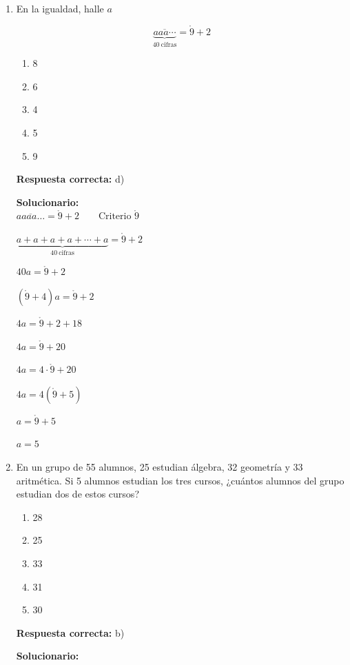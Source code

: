 \begin{enumerate}
	$x=40$
	
	\vspace{6mm}
	
	\item En la igualdad, halle $a$
	
	$$\overline{\underbrace{aaa\cdots}_{40\ \text{cifras}}}=\mathring{9}
	+2$$
	
	\begin{enumerate}[label=\alph*)]
		\item 8
		\item 6
		\item 4
		\item 5
		\item 9
	\end{enumerate}
	\textbf{Respuesta correcta:} d)
	
	\vspace{2mm}
	\textbf{Solucionario:}\\
	
	$\overline{aaaa\ldots}=\mathring{9}+2 \qquad \text{Criterio $\mathring{9}$}$
	
	$\underbrace{a+a+a+a+\cdots+a}_{40\ \text{cifras}}=\mathring{9}+2$
	
	$40a=\mathring{9}+2$
	
	$(\mathring{9}+4)a=\mathring{9}+2$
	
	$4a=\mathring{9}+2+18$
	
	$4a=\mathring{9}+20$
	
	$4a=4\cdot \mathring{9}+20$
	
	$4a=4(\mathring{9}+5)$
	
	$a=\mathring{9}+5$
	
	$a=5$
	
	
	\vspace{6mm}
	
	\item En un grupo de 55 alumnos, 25 estudian álgebra, 32 geometría y 33 aritmética. Si 5 alumnos estudian los tres cursos, ¿cuántos alumnos del grupo estudian dos de estos cursos?
	\begin{enumerate}[label=\alph*)]
		\item 28
		\item 25
		\item 33
		\item 31
		\item 30
	\end{enumerate}
	\textbf{Respuesta correcta:} b)
	
	\vspace{2mm}
	\textbf{Solucionario:}\\
	

\end{enumerate}

